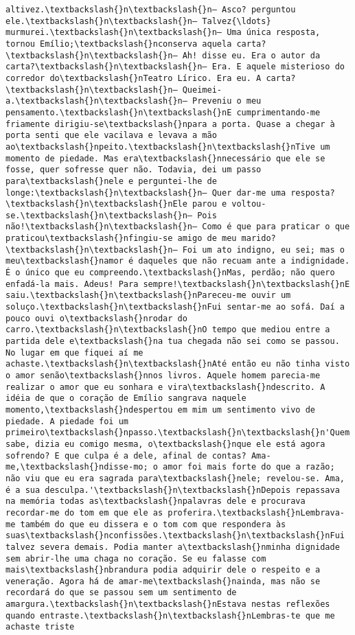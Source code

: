 \begin{Verbatim}[commandchars=\\\{\}]
altivez.\textbackslash{}n\textbackslash{}n— Asco? perguntou ele.\textbackslash{}n\textbackslash{}n— Talvez{\ldots} murmurei.\textbackslash{}n\textbackslash{}n— Uma única resposta, tornou Emílio;\textbackslash{}nconserva aquela carta?\textbackslash{}n\textbackslash{}n— Ah! disse eu. Era o autor da carta?\textbackslash{}n\textbackslash{}n— Era. E aquele misterioso do corredor do\textbackslash{}nTeatro Lírico. Era eu. A carta?\textbackslash{}n\textbackslash{}n— Queimei-a.\textbackslash{}n\textbackslash{}n— Preveniu o meu pensamento.\textbackslash{}n\textbackslash{}nE cumprimentando-me friamente dirigiu-se\textbackslash{}npara a porta. Quase a chegar à porta senti que ele vacilava e levava a mão ao\textbackslash{}npeito.\textbackslash{}n\textbackslash{}nTive um momento de piedade. Mas era\textbackslash{}nnecessário que ele se fosse, quer sofresse quer não. Todavia, dei um passo para\textbackslash{}nele e perguntei-lhe de longe:\textbackslash{}n\textbackslash{}n— Quer dar-me uma resposta?\textbackslash{}n\textbackslash{}nEle parou e voltou-se.\textbackslash{}n\textbackslash{}n— Pois não!\textbackslash{}n\textbackslash{}n— Como é que para praticar o que praticou\textbackslash{}nfingiu-se amigo de meu marido?\textbackslash{}n\textbackslash{}n— Foi um ato indigno, eu sei; mas o meu\textbackslash{}namor é daqueles que não recuam ante a indignidade. É o único que eu compreendo.\textbackslash{}nMas, perdão; não quero enfadá-la mais. Adeus! Para sempre!\textbackslash{}n\textbackslash{}nE saiu.\textbackslash{}n\textbackslash{}nPareceu-me ouvir um soluço.\textbackslash{}n\textbackslash{}nFui sentar-me ao sofá. Daí a pouco ouvi o\textbackslash{}nrodar do carro.\textbackslash{}n\textbackslash{}nO tempo que mediou entre a partida dele e\textbackslash{}na tua chegada não sei como se passou. No lugar em que fiquei aí me achaste.\textbackslash{}n\textbackslash{}nAté então eu não tinha visto o amor senão\textbackslash{}nnos livros. Aquele homem parecia-me realizar o amor que eu sonhara e vira\textbackslash{}ndescrito. A idéia de que o coração de Emílio sangrava naquele momento,\textbackslash{}ndespertou em mim um sentimento vivo de piedade. A piedade foi um primeiro\textbackslash{}npasso.\textbackslash{}n\textbackslash{}n'Quem sabe, dizia eu comigo mesma, o\textbackslash{}nque ele está agora sofrendo? E que culpa é a dele, afinal de contas? Ama-me,\textbackslash{}ndisse-mo; o amor foi mais forte do que a razão; não viu que eu era sagrada para\textbackslash{}nele; revelou-se. Ama, é a sua desculpa.'\textbackslash{}n\textbackslash{}nDepois repassava na memória todas as\textbackslash{}npalavras dele e procurava recordar-me do tom em que ele as proferira.\textbackslash{}nLembrava-me também do que eu dissera e o tom com que respondera às suas\textbackslash{}nconfissões.\textbackslash{}n\textbackslash{}nFui talvez severa demais. Podia manter a\textbackslash{}nminha dignidade sem abrir-lhe uma chaga no coração. Se eu falasse com mais\textbackslash{}nbrandura podia adquirir dele o respeito e a veneração. Agora há de amar-me\textbackslash{}nainda, mas não se recordará do que se passou sem um sentimento de amargura.\textbackslash{}n\textbackslash{}nEstava nestas reflexões quando entraste.\textbackslash{}n\textbackslash{}nLembras-te que me achaste triste 
\end{Verbatim}
